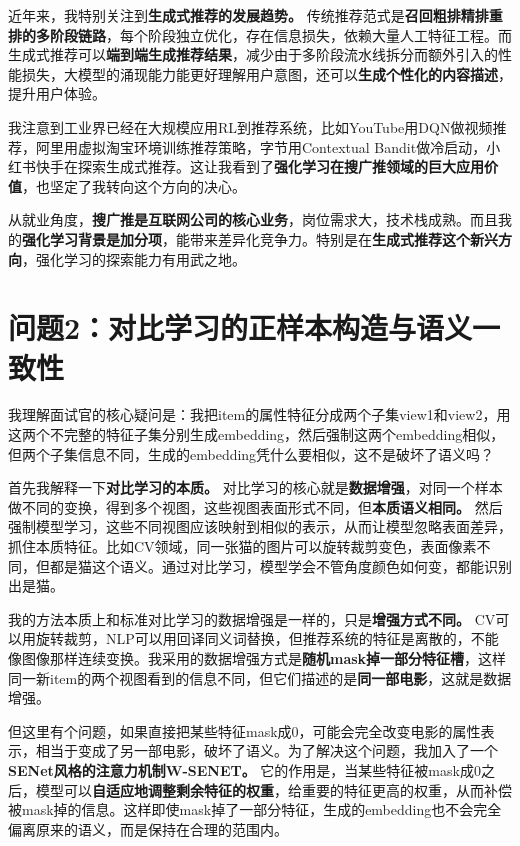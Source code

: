 \documentclass[UTF8]{ctexart}
\begin{document}
近年来，我特别关注到\textbf{生成式推荐的发展趋势。} 传统推荐范式是\textbf{召回粗排精排重排的多阶段链路}，每个阶段独立优化，存在信息损失，依赖大量人工特征工程。而生成式推荐可以\textbf{端到端生成推荐结果}，减少由于多阶段流水线拆分而额外引入的性能损失，大模型的涌现能力能更好理解用户意图，还可以\textbf{生成个性化的内容描述}，提升用户体验。

我注意到工业界已经在大规模应用RL到推荐系统，比如YouTube用DQN做视频推荐，阿里用虚拟淘宝环境训练推荐策略，字节用Contextual Bandit做冷启动，小红书快手在探索生成式推荐。这让我看到了\textbf{强化学习在搜广推领域的巨大应用价值}，也坚定了我转向这个方向的决心。

从就业角度，\textbf{搜广推是互联网公司的核心业务}，岗位需求大，技术栈成熟。而且我的\textbf{强化学习背景是加分项}，能带来差异化竞争力。特别是在\textbf{生成式推荐这个新兴方向}，强化学习的探索能力有用武之地。

\section{问题2：对比学习的正样本构造与语义一致性}
我理解面试官的核心疑问是：我把item的属性特征分成两个子集view1和view2，用这两个不完整的特征子集分别生成embedding，然后强制这两个embedding相似，但两个子集信息不同，生成的embedding凭什么要相似，这不是破坏了语义吗？

首先我解释一下\textbf{对比学习的本质。} 对比学习的核心就是\textbf{数据增强}，对同一个样本做不同的变换，得到多个视图，这些视图表面形式不同，但\textbf{本质语义相同。} 然后强制模型学习，这些不同视图应该映射到相似的表示，从而让模型忽略表面差异，抓住本质特征。比如CV领域，同一张猫的图片可以旋转裁剪变色，表面像素不同，但都是猫这个语义。通过对比学习，模型学会不管角度颜色如何变，都能识别出是猫。

我的方法本质上和标准对比学习的数据增强是一样的，只是\textbf{增强方式不同。} CV可以用旋转裁剪，NLP可以用回译同义词替换，但推荐系统的特征是离散的，不能像图像那样连续变换。我采用的数据增强方式是\textbf{随机mask掉一部分特征槽}，这样同一新item的两个视图看到的信息不同，但它们描述的是\textbf{同一部电影}，这就是数据增强。

但这里有个问题，如果直接把某些特征mask成0，可能会完全改变电影的属性表示，相当于变成了另一部电影，破坏了语义。为了解决这个问题，我加入了一个\textbf{SENet风格的注意力机制W-SENET。} 它的作用是，当某些特征被mask成0之后，模型可以\textbf{自适应地调整剩余特征的权重}，给重要的特征更高的权重，从而补偿被mask掉的信息。这样即使mask掉了一部分特征，生成的embedding也不会完全偏离原来的语义，而是保持在合理的范围内。
\end{document}
